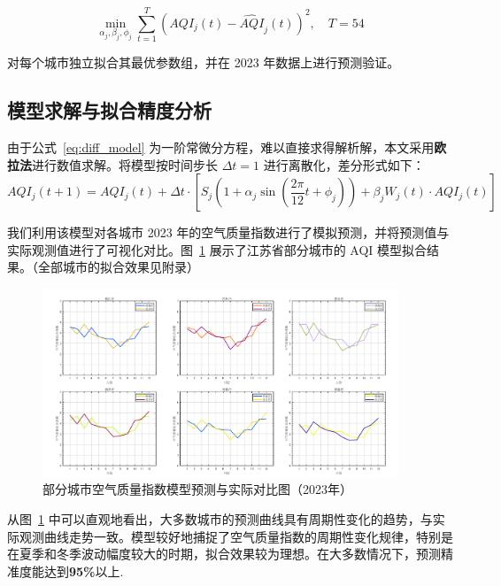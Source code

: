 \documentclass[a4paper,12pt]{article}
\begin{document}
	\begin{equation}
		\min_{\alpha_j, \beta_j, \phi_j} \sum_{t=1}^{T} \left( AQI_j(t) - \widehat{AQI}_j(t) \right)^2, \quad T = 54
		\label{eq:lsq}
	\end{equation}
	
	对每个城市独立拟合其最优参数组，并在 2023 年数据上进行预测验证。
	
	\subsection{模型求解与拟合精度分析}
	
	由于公式~\eqref{eq:diff_model} 为一阶常微分方程，难以直接求得解析解，本文采用\textbf{欧拉法}进行数值求解。将模型按时间步长 $\Delta t = 1$ 进行离散化，差分形式如下：
	\begin{equation}
		AQI_j(t + 1) = AQI_j(t) + \Delta t \cdot \left[ S_j \left(1 + \alpha_j \sin\left(\frac{2\pi}{12}t + \phi_j \right) \right) + \beta_j W_j(t) \cdot AQI_j(t) \right]
		\label{eq:euler}
	\end{equation}
	
	我们利用该模型对各城市 2023 年的空气质量指数进行了模拟预测，并将预测值与实际观测值进行了可视化对比。图~\ref{fig:model_fit} 展示了江苏省部分城市的 AQI 模型拟合结果。（全部城市的拟合效果见附录）
	\begin{figure}[htbp]
		\centering
		\includegraphics[width=0.95\textwidth]{模型效果(1)(1).png}
		\caption{部分城市空气质量指数模型预测与实际对比图（2023年）}
		\label{fig:model_fit}
	\end{figure}
	
	从图~\ref{fig:model_fit} 中可以直观地看出，大多数城市的预测曲线具有周期性变化的趋势，与实际观测曲线走势一致。模型较好地捕捉了空气质量指数的周期性变化规律，特别是在夏季和冬季波动幅度较大的时期，拟合效果较为理想。在大多数情况下，预测精准度能达到\textbf{95\%}以上.
	
\end{document}
